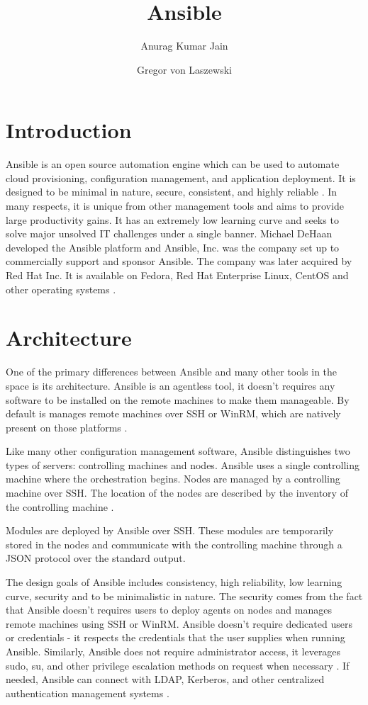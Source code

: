 \documentclass[9pt,twocolumn,twoside]{../../styles/osajnl}
\title{Ansible}
\author[1]{Anurag Kumar Jain}
\author[1,*]{Gregor von Laszewski}
\affil[1]{School of Informatics and Computing, Bloomington, IN 47408, U.S.A.}
\affil[*]{Corresponding authors: laszewski@gmail.com}
\begin{document}
\maketitle

\section{Introduction}

Ansible is an open source automation engine which can be used to
automate cloud provisioning, configuration management, and application
deployment. It is designed to be minimal in nature, secure,
consistent, and highly reliable \cite{www-ansible3}. In many respects,
it is unique from other management tools and aims to provide large
productivity gains. It has an extremely low learning curve and seeks
to solve major unsolved IT challenges under a single banner.  Michael
DeHaan developed the Ansible platform and Ansible, Inc. was the
company set up to commercially support and sponsor Ansible. The
company was later acquired by Red Hat Inc. It is available on Fedora,
Red Hat Enterprise Linux, CentOS and other operating
systems \cite{www-ansible-wikipedia}.

\section{Architecture}

One of the primary differences between Ansible and many other tools in
the space is its architecture. Ansible is an agentless tool, it
doesn't requires any software to be installed on the remote machines
to make them manageable. By default is manages remote machines over
SSH or WinRM, which are natively present on those
platforms \cite{www-ansible}.

Like many other configuration management software, Ansible
distinguishes two types of servers: controlling machines and
nodes. Ansible uses a single controlling machine where the
orchestration begins. Nodes are managed by a controlling machine over
SSH. The location of the nodes are described by the inventory of the
controlling machine \cite{www-ansible3}.

Modules are deployed by Ansible over SSH. These modules are
temporarily stored in the nodes and communicate with the controlling
machine through a JSON protocol over the standard
output.\cite{www-ansible}

The design goals of Ansible includes consistency, high reliability,
low learning curve, security and to be minimalistic in nature. The
security comes from the fact that Ansible doesn't requires users to
deploy agents on nodes and manages remote machines using SSH or
WinRM. Ansible doesn't require dedicated users or credentials - it
respects the credentials that the user supplies when running
Ansible. Similarly, Ansible does not require administrator access, it
leverages sudo, su, and other privilege escalation methods on request
when necessary \cite{github-ansible}. If needed, Ansible can connect
with LDAP, Kerberos, and other centralized authentication management
systems \cite{www-ansible2}.
\end{document}
